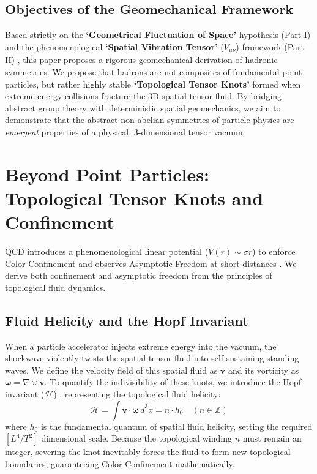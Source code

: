 \documentclass[reprint,amsmath,amssymb,aps,prd]{revtex4-2}
\begin{document}
\subsection{Objectives of the Geomechanical Framework}
Based strictly on the \textbf{`Geometrical Fluctuation of Space'} hypothesis (Part I) \cite{YooPart1} and the phenomenological \textbf{`Spatial Vibration Tensor'} ($\tilde{V}_{\mu\nu}$) framework (Part II) \cite{YooPart2}, this paper proposes a rigorous geomechanical derivation of hadronic symmetries. We propose that hadrons are not composites of fundamental point particles, but rather highly stable \textbf{`Topological Tensor Knots'} formed when extreme-energy collisions fracture the 3D spatial tensor fluid. By bridging abstract group theory with deterministic spatial geomechanics, we aim to demonstrate that the abstract non-abelian symmetries of particle physics are \textit{emergent} properties of a physical, 3-dimensional tensor vacuum.

\section{Beyond Point Particles: Topological Tensor Knots and Confinement}

QCD introduces a phenomenological linear potential ($V(r) \sim \sigma r$) to enforce Color Confinement and observes Asymptotic Freedom at short distances \cite{Gross1973}. We derive both confinement and asymptotic freedom from the principles of topological fluid dynamics.

\subsection{Fluid Helicity and the Hopf Invariant}
When a particle accelerator injects extreme energy into the vacuum, the shockwave violently twists the spatial tensor fluid into self-sustaining standing waves. We define the velocity field of this spatial fluid as $\mathbf{v}$ and its vorticity as $\boldsymbol{\omega} = \nabla \times \mathbf{v}$. To quantify the indivisibility of these knots, we introduce the Hopf invariant ($\mathcal{H}$) \cite{Moffatt1969}, representing the topological fluid helicity:
\begin{equation}
\mathcal{H} = \int \mathbf{v} \cdot \boldsymbol{\omega} \, d^3x = n \cdot h_0 \quad (n \in \mathbb{Z})
\end{equation}
where $h_0$ is the fundamental quantum of spatial fluid helicity, setting the required $[L^4/T^2]$ dimensional scale. Because the topological winding $n$ must remain an integer, severing the knot inevitably forces the fluid to form new topological boundaries, guaranteeing Color Confinement mathematically.
\end{document}
